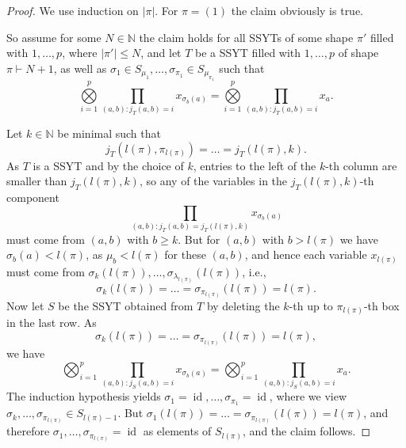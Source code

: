 \documentclass[a4paper]{amsart}
\def\N{{\mathbb{N}}}
\DeclareMathOperator{\id}{\mathrm{id}}
\newcommand{\abs}[1]{\left| #1\right|}
\begin{document}
\begin{proof}
	We use induction on $\abs{\pi}$.
	For $\pi=(1)$ the claim obviously is true.
	
	So assume for some $N\in\N$ the claim holds for all SSYTs of some shape $\pi'$ filled with $1,\ldots,p$, where $\abs{\pi'}\leq N$,
	and let $T$ be a SSYT filled with $1,\ldots,p$ of shape $\pi\vdash N+1$,
	as well as $\sigma_1\in S_{\mu_1},\ldots,\sigma_{\pi_1}\in S_{\mu_{\pi_1}}$ such that
	\begin{displaymath}
		\bigotimes\limits_{i=1}^p\prod\limits_{(a,b):j_T(a,b)=i}x_{\sigma_b(a)}=
		\bigotimes\limits_{i=1}^p\prod\limits_{(a,b):j_T(a,b)=i}x_{a}.
	\end{displaymath}
	
	Let $k\in\N$ be minimal such that
	\begin{displaymath}
		j_T(l(\pi),\pi_{l(\pi)})=\ldots=j_T(l(\pi),k).
	\end{displaymath}
	As $T$ is a SSYT and by the choice of $k$,
	entries to the left of the $k$-th column are smaller than $j_T(l(\pi),k)$,
	so any of the variables in the $j_T(l(\pi),k)$-th component
	\begin{displaymath}
		\prod\limits_{(a,b): j_T(a,b)=j_T(l(\pi),k)}x_{\sigma_b(a)}
	\end{displaymath}
	must come from $(a,b)$ with $b\geq k$.
	But for $(a,b)$ with $b>l(\pi)$ we have $\sigma_b(a)<l(\pi)$, as $\mu_b<l(\pi)$ for these $(a,b)$,
	and hence each variable $x_{l(\pi)}$ must come from $\sigma_k(l(\pi)),\ldots,\sigma_{\lambda_{l(\pi)}}(l(\pi))$, i.e.,
	\begin{displaymath}
		\sigma_k(l(\pi))=\ldots=\sigma_{\pi_{l(\pi)}}(l(\pi))=l(\pi).
	\end{displaymath}
	Now let $S$ be the SSYT obtained from $T$ by deleting the $k$-th up to $\pi_{l(\pi)}$-th box in the last row.
	As
	\begin{displaymath}
		\sigma_k(l(\pi))=\ldots=\sigma_{\pi_{l(\pi)}}(l(\pi))=l(\pi),
	\end{displaymath}
	we have
	\begin{displaymath}
		\bigotimes_{i=1}^p\prod\limits_{(a,b):j_S(a,b)=i}x_{\sigma_b(a)}=
		\bigotimes_{i=1}^p\prod\limits_{(a,b):j_S(a,b)=i}x_{a}.
	\end{displaymath}
	The induction hypothesis yields $\sigma_1=\id,\ldots,\sigma_{\pi_1}=\id$,
	where we view $\sigma_k,\ldots,\sigma_{\pi_{l(\pi)}}\in S_{l(\pi)-1}$.
	But $\sigma_1(l(\pi))=\ldots=\sigma_{\pi_{l(\pi)}}(l(\pi))=l(\pi)$,
	and therefore $\sigma_1,\ldots,\sigma_{\pi_{l(\pi)}}=\id$ as elements of $S_{l(\pi)}$,
	and the claim follows.
\end{proof}
\end{document}
